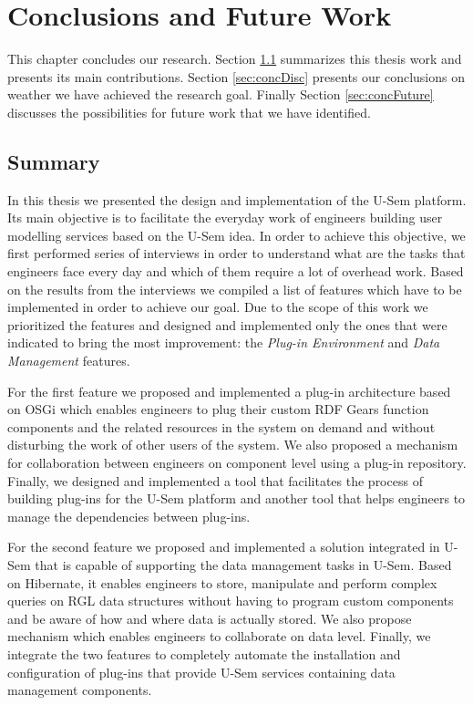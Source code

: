 
\chapter{\label{cha:conclusions}Conclusions and Future Work}

This chapter concludes our research. Section \ref{sec:concSumm} summarizes this thesis work and presents its main contributions. Section \ref{sec:concDisc} presents our conclusions on weather we have achieved the research goal. Finally Section \ref{sec:concFuture} discusses the possibilities for future work that we have identified.


\section{Summary}
\label{sec:concSumm}

In this thesis we presented the design and implementation of the U-Sem platform. Its main objective is to facilitate the everyday work of engineers building user modelling services based on the U-Sem idea. In order to achieve this objective, we first performed series of interviews in order to understand what are the tasks that engineers face every day and which of them require a lot of overhead work. Based on the results from the interviews we compiled a list of features which have to be implemented in order to achieve our goal. Due to the scope of this work we prioritized the features and designed and implemented only the ones that were indicated to bring the most improvement: the \textit{Plug-in Environment} and \textit{Data Management} features.

For the first feature we proposed and implemented a plug-in architecture based on OSGi which enables engineers to plug their custom RDF Gears function components and the related resources in the system on demand and without disturbing the work of other users of the system. We also proposed a mechanism for collaboration between engineers on component level using a plug-in repository. Finally, we designed and implemented a tool that facilitates the process of building plug-ins for the U-Sem platform and another tool that helps engineers to manage the dependencies between plug-ins.

For the second feature we proposed and implemented a solution integrated in U-Sem that is capable of supporting the data management tasks in U-Sem. Based on Hibernate, it enables engineers to store, manipulate and perform complex queries on RGL data structures without having to program custom components and be aware of how and where data is actually stored. We also propose mechanism which enables engineers to collaborate on data level. Finally, we integrate the two features to completely automate the installation and configuration of plug-ins that provide U-Sem services containing data management components.


